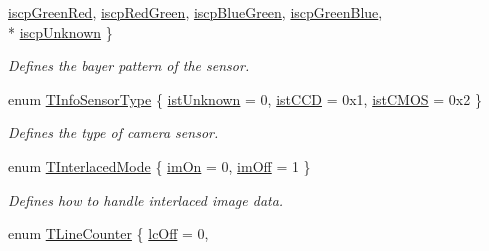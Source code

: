 \begin{DoxyCompactItemize}
\hyperlink{group___device_specific_interface_gga3a851956283d4fe464e3e9e2e1c85734a37ceda728c34125268affc1d0ee06a6e}{iscp\+Green\+Red}, 
\hyperlink{group___device_specific_interface_gga3a851956283d4fe464e3e9e2e1c85734a31faed3c2a05ec15aa93a3265e1447ba}{iscp\+Red\+Green}, 
\hyperlink{group___device_specific_interface_gga3a851956283d4fe464e3e9e2e1c85734a19d15b960ec09b1d422e29cba0e9aa88}{iscp\+Blue\+Green}, 
\hyperlink{group___device_specific_interface_gga3a851956283d4fe464e3e9e2e1c85734a6b055600cdbc2600101d2d802dfe58d1}{iscp\+Green\+Blue}, 
\\*
\hyperlink{group___device_specific_interface_gga3a851956283d4fe464e3e9e2e1c85734a93a09c12342670d8e7128a1c81940a00}{iscp\+Unknown}
 \}
\begin{DoxyCompactList}\small\item\em Defines the bayer pattern of the sensor. \end{DoxyCompactList}\item 
enum \hyperlink{group___device_specific_interface_gaa1c7fc61c4ab1828d517f3b15909a1a5}{T\+Info\+Sensor\+Type} \{ \hyperlink{group___device_specific_interface_ggaa1c7fc61c4ab1828d517f3b15909a1a5aadace771610efdec84773be80e86810c}{ist\+Unknown} = 0, 
\hyperlink{group___device_specific_interface_ggaa1c7fc61c4ab1828d517f3b15909a1a5ade0c9a5dd4ef8b56b818596fc7732dcb}{ist\+C\+C\+D} = 0x1, 
\hyperlink{group___device_specific_interface_ggaa1c7fc61c4ab1828d517f3b15909a1a5a708281aa31fdf3aafd292ed3859c3a81}{ist\+C\+M\+O\+S} = 0x2
 \}
\begin{DoxyCompactList}\small\item\em Defines the type of camera sensor. \end{DoxyCompactList}\item 
enum \hyperlink{group___device_specific_interface_gafb928ff52f5c386fa1bac255d6850ff9}{T\+Interlaced\+Mode} \{ \hyperlink{group___device_specific_interface_ggafb928ff52f5c386fa1bac255d6850ff9a6189673587b95ab855e95613daa509d5}{im\+On} = 0, 
\hyperlink{group___device_specific_interface_ggafb928ff52f5c386fa1bac255d6850ff9ade1301d042604ff31a884ef8fb93e4bf}{im\+Off} = 1
 \}
\begin{DoxyCompactList}\small\item\em Defines how to handle interlaced image data. \end{DoxyCompactList}\item 
enum \hyperlink{group___device_specific_interface_gab9051a0d97eafeaff2951aa0196f14eb}{T\+Line\+Counter} \{ \hyperlink{group___device_specific_interface_ggab9051a0d97eafeaff2951aa0196f14eba197c1ef2f2c0d4489d90e46475b6fbb7}{lc\+Off} = 0, 

\end{DoxyCompactItemize}
